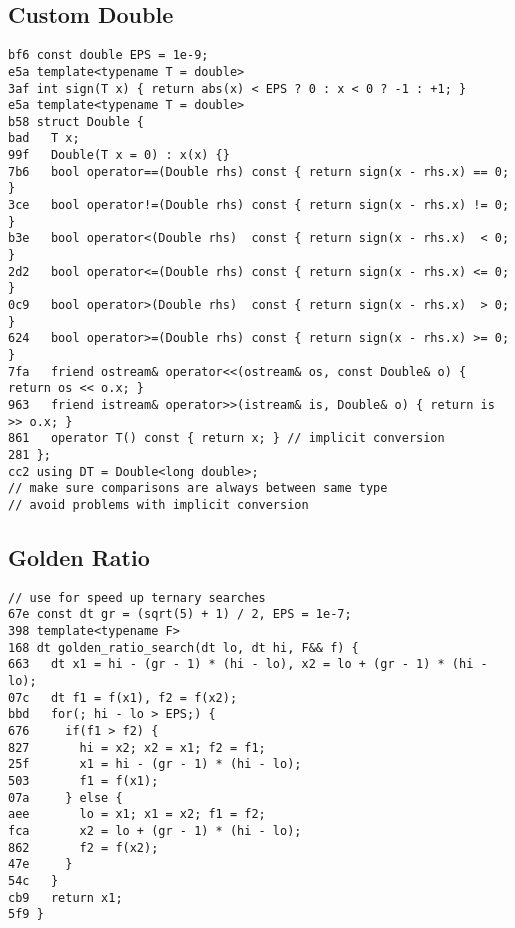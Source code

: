 \documentclass[10pt, a4paper, twoside]{article}
\begin{document}
\subsection{Custom Double}
\begin{lstlisting}
bf6 const double EPS = 1e-9;
e5a template<typename T = double>
3af int sign(T x) { return abs(x) < EPS ? 0 : x < 0 ? -1 : +1; }
e5a template<typename T = double>
b58 struct Double {
bad   T x;
99f   Double(T x = 0) : x(x) {}
7b6   bool operator==(Double rhs) const { return sign(x - rhs.x) == 0; }
3ce   bool operator!=(Double rhs) const { return sign(x - rhs.x) != 0; }
b3e   bool operator<(Double rhs)  const { return sign(x - rhs.x)  < 0; }
2d2   bool operator<=(Double rhs) const { return sign(x - rhs.x) <= 0; }
0c9   bool operator>(Double rhs)  const { return sign(x - rhs.x)  > 0; }
624   bool operator>=(Double rhs) const { return sign(x - rhs.x) >= 0; }
7fa   friend ostream& operator<<(ostream& os, const Double& o) { return os << o.x; }
963   friend istream& operator>>(istream& is, Double& o) { return is >> o.x; }
861   operator T() const { return x; } // implicit conversion
281 };
cc2 using DT = Double<long double>;
// make sure comparisons are always between same type
// avoid problems with implicit conversion
\end{lstlisting}

\subsection{Golden Ratio}
\begin{lstlisting}
// use for speed up ternary searches
67e const dt gr = (sqrt(5) + 1) / 2, EPS = 1e-7;
398 template<typename F>
168 dt golden_ratio_search(dt lo, dt hi, F&& f) {
663   dt x1 = hi - (gr - 1) * (hi - lo), x2 = lo + (gr - 1) * (hi - lo);
07c   dt f1 = f(x1), f2 = f(x2);
bbd   for(; hi - lo > EPS;) {
676     if(f1 > f2) {
827       hi = x2; x2 = x1; f2 = f1;
25f       x1 = hi - (gr - 1) * (hi - lo);
503       f1 = f(x1);
07a     } else {
aee       lo = x1; x1 = x2; f1 = f2;
fca       x2 = lo + (gr - 1) * (hi - lo);
862       f2 = f(x2);
47e     }
54c   }
cb9   return x1;
5f9 }
\end{lstlisting}
\end{document}
